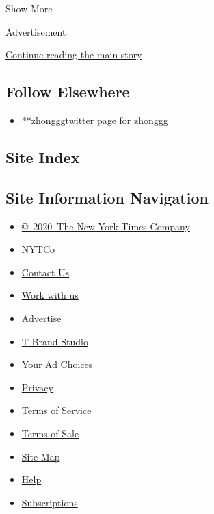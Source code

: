 Show More

Advertisement

\protect\hyperlink{after-mid2}{Continue reading the main story}

\hypertarget{follow-elsewhere}{%
\subsection{Follow Elsewhere}\label{follow-elsewhere}}

\begin{itemize}
\tightlist
\item
  \href{https://twitter.com/zhonggg}{**zhongggtwitter page for zhonggg}
\end{itemize}

\hypertarget{site-index}{%
\subsection{Site Index}\label{site-index}}

\hypertarget{site-information-navigation}{%
\subsection{Site Information
Navigation}\label{site-information-navigation}}

\begin{itemize}
\tightlist
\item
  \href{https://help.nytimes3xbfgragh.onion/hc/en-us/articles/115014792127-Copyright-notice}{©~2020~The
  New York Times Company}
\end{itemize}

\begin{itemize}
\tightlist
\item
  \href{https://www.nytco.com/}{NYTCo}
\item
  \href{https://help.nytimes3xbfgragh.onion/hc/en-us/articles/115015385887-Contact-Us}{Contact
  Us}
\item
  \href{https://www.nytco.com/careers/}{Work with us}
\item
  \href{https://nytmediakit.com/}{Advertise}
\item
  \href{http://www.tbrandstudio.com/}{T Brand Studio}
\item
  \href{https://www.nytimes3xbfgragh.onion/privacy/cookie-policy\#how-do-i-manage-trackers}{Your
  Ad Choices}
\item
  \href{https://www.nytimes3xbfgragh.onion/privacy}{Privacy}
\item
  \href{https://help.nytimes3xbfgragh.onion/hc/en-us/articles/115014893428-Terms-of-service}{Terms
  of Service}
\item
  \href{https://help.nytimes3xbfgragh.onion/hc/en-us/articles/115014893968-Terms-of-sale}{Terms
  of Sale}
\item
  \href{https://spiderbites.nytimes3xbfgragh.onion}{Site Map}
\item
  \href{https://help.nytimes3xbfgragh.onion/hc/en-us}{Help}
\item
  \href{https://www.nytimes3xbfgragh.onion/subscription?campaignId=37WXW}{Subscriptions}
\end{itemize}
